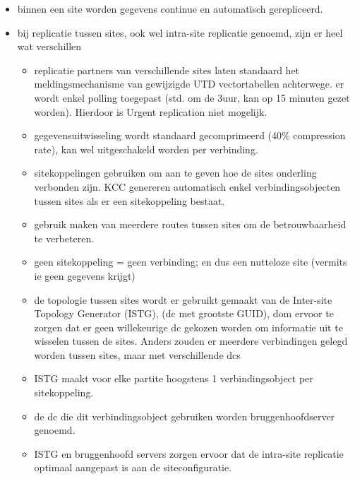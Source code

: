 \begin{itemize}
\item binnen een site worden gegevens continue en automatisch gerepliceerd.
\item bij replicatie tussen sites, ook wel intra-site replicatie genoemd, zijn er heel wat verschillen
\begin{itemize}
\item replicatie partners van verschillende sites laten standaard het meldingsmechanisme van gewijzigde UTD vectortabellen achterwege. er wordt enkel polling toegepast (std. om de 3uur, kan op 15 minuten gezet worden). Hierdoor is Urgent replication niet mogelijk. 
\item gegevensuitwisseling wordt standaard gecomprimeerd (40\% compression rate), kan wel uitgeschakeld worden per verbinding.
\item sitekoppelingen gebruiken om aan te geven hoe de sites onderling verbonden zijn. KCC genereren automatisch enkel verbindingsobjecten tussen sites als er een sitekoppeling bestaat.
\item gebruik maken van meerdere routes tussen sites om de betrouwbaarheid te verbeteren.
\item geen sitekoppeling = geen verbinding; en dus een nutteloze site (vermits ie geen gegevens krijgt)
\clearpage
\item de topologie tussen sites wordt er gebruikt gemaakt van de Inter-site Topology Generator (ISTG), (dc met grootste GUID), dom ervoor te zorgen dat er geen willekeurige dc gekozen worden om informatie uit te wisselen tussen de sites. Anders zouden er meerdere verbindingen gelegd worden tussen sites, maar met verschillende dcs
\item ISTG maakt voor elke partite hoogstens 1 verbindingsobject per sitekoppeling.
\item de dc die dit verbindingsobject gebruiken worden bruggenhoofdserver genoemd. 
\item ISTG en bruggenhoofd servers zorgen ervoor dat de intra-site replicatie optimaal aangepast is aan de siteconfiguratie.
\end{itemize}
\end{itemize}







